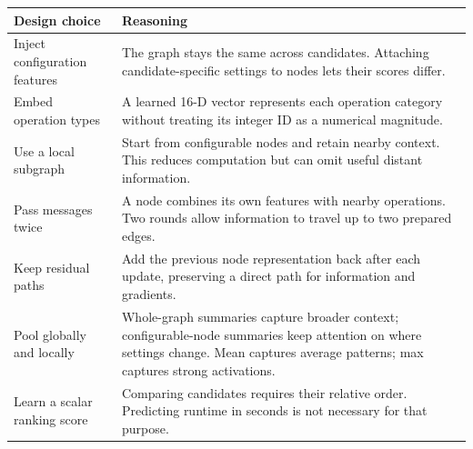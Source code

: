 \documentclass[11pt,a4paper]{article}
\begin{document}
\begin{center}
\begin{tabular}{@{}>{\raggedright\arraybackslash}p{4.3cm}>{\raggedright\arraybackslash}p{10.7cm}@{}}
\toprule
\textbf{Design choice} & \textbf{Reasoning}\\\midrule
Inject configuration features & The graph stays the same across candidates. Attaching candidate-specific settings to nodes lets their scores differ.\\[4pt]
Embed operation types & A learned 16-D vector represents each operation category without treating its integer ID as a numerical magnitude.\\[4pt]
Use a local subgraph & Start from configurable nodes and retain nearby context. This reduces computation but can omit useful distant information.\\[4pt]
Pass messages twice & A node combines its own features with nearby operations. Two rounds allow information to travel up to two prepared edges.\\[4pt]
Keep residual paths & Add the previous node representation back after each update, preserving a direct path for information and gradients.\\[4pt]
Pool globally and locally & Whole-graph summaries capture broader context; configurable-node summaries keep attention on where settings change. Mean captures average patterns; max captures strong activations.\\[4pt]
Learn a scalar ranking score & Comparing candidates requires their relative order. Predicting runtime in seconds is not necessary for that purpose.\\\bottomrule
\end{tabular}
\end{center}
\end{document}
